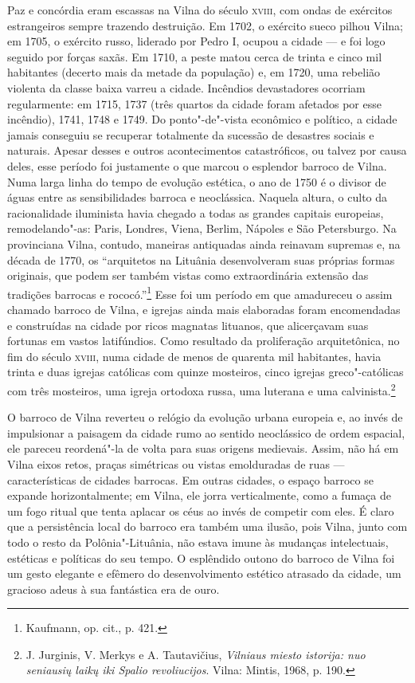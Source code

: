 Paz e concórdia eram escassas na Vilna do século \textsc{xviii}, com ondas de
exércitos estrangeiros sempre trazendo destruição. Em 1702, o exército
sueco pilhou Vilna; em 1705, o exército russo, liderado por Pedro I,
ocupou a cidade --- e foi logo seguido por forças saxãs. Em 1710, a peste
matou cerca de trinta e cinco mil habitantes (decerto mais da metade da
população) e, em 1720, uma rebelião violenta da classe baixa varreu a
cidade. Incêndios devastadores ocorriam regularmente: em 1715, 1737
(três quartos da cidade foram afetados por esse incêndio), 1741, 1748 e
1749. Do ponto"-de"-vista econômico e político, a cidade jamais conseguiu
se recuperar totalmente da sucessão de desastres sociais e naturais.
Apesar desses e outros acontecimentos catastróficos, ou talvez por causa
deles, esse período foi justamente o que marcou o esplendor barroco de
Vilna. Numa larga linha do tempo de evolução estética, o ano de 1750 é o
divisor de águas entre as sensibilidades barroca e neoclássica. Naquela
altura, o culto da racionalidade iluminista havia chegado a todas as
grandes capitais europeias, remodelando"-as: Paris, Londres, Viena,
Berlim, Nápoles e São Petersburgo. Na provinciana Vilna, contudo,
maneiras antiquadas ainda reinavam supremas e, na década de 1770, os
``arquitetos na Lituânia desenvolveram suas próprias formas originais,
que podem ser também vistas como extraordinária extensão das tradições
barrocas e rococó.''\footnote{Kaufmann, op. cit., p. 421.} Esse foi um
período em que amadureceu o assim chamado barroco de Vilna, e igrejas
ainda mais elaboradas foram encomendadas e construídas na cidade por
ricos magnatas lituanos, que alicerçavam suas fortunas em vastos
latifúndios. Como resultado da proliferação arquitetônica, no fim do
século \textsc{xviii}, numa cidade de menos de quarenta mil habitantes, havia trinta
e duas igrejas católicas com quinze mosteiros, cinco igrejas
greco"-católicas com três mosteiros, uma igreja ortodoxa russa, uma
luterana e uma calvinista.\footnote{J. Jurginis, V. Merkys e A. Tautavičius, \textit{Vilniaus miesto istorija: nuo seniausių laikų iki Spalio revoliucijos}. Vilna: Mintis, 1968, p. 190.}
%

O barroco de Vilna reverteu o relógio da evolução urbana europeia e, ao
invés de impulsionar a paisagem da cidade rumo ao sentido neoclássico de
ordem espacial, ele pareceu reordená"-la de volta para suas origens
medievais. Assim, não há em Vilna eixos retos, praças simétricas ou
vistas emolduradas de ruas --- características de cidades barrocas. Em
outras cidades, o espaço barroco se expande horizontalmente; em Vilna,
ele jorra verticalmente, como a fumaça de um fogo ritual que tenta
aplacar os céus ao invés de competir com eles. É claro que a
persistência local do barroco era também uma ilusão, pois Vilna, junto
com todo o resto da Polônia"-Lituânia, não estava imune às mudanças
intelectuais, estéticas e políticas do seu tempo. O esplêndido outono do
barroco de Vilna foi um gesto elegante e efêmero do desenvolvimento
estético atrasado da cidade, um gracioso adeus à sua fantástica era de
ouro.

